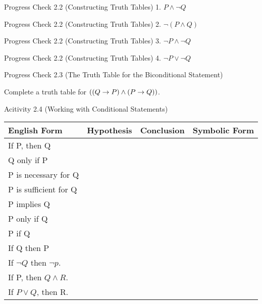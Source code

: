 \documentclass{beamer}
\begin{document}
\begin{frame}{Progress Check 2.2 (Constructing Truth Tables)}
	1. $P \wedge \neg Q$
\end{frame}

\begin{frame}{Progress Check 2.2 (Constructing Truth Tables)}
	2. $\neg(P \wedge Q)$
\end{frame}

\begin{frame}{Progress Check 2.2 (Constructing Truth Tables)}
	3. $\neg P \wedge \neg Q$
\end{frame}

\begin{frame}{Progress Check 2.2 (Constructing Truth Tables)}
	4. $\neg P \vee \neg Q$
\end{frame}

\begin{frame}{Progress Check 2.3 (The Truth Table for the Biconditional Statement)}
	\begin{center}
		Complete a truth table for $\large((Q \to P) \wedge (P \to Q)\large)$.
	\end{center}
	\vspace{3 in}
\end{frame} 

\begin{frame}{Acitivity 2.4 (Working with Conditional Statements)}
	\begin{tabular}{|l|c|c|c|}
		\hline
		English Form & Hypothesis & Conclusion & Symbolic Form\\[.05 in] \hline
		If P, then Q &&&\\[.05 in] \hline
		Q only if P  &&&\\[.05 in] \hline
		P is necessary for Q  &&&\\[.05 in] \hline
		P is sufficient for Q  &&&\\[.05 in] \hline
		P implies Q  &&&\\[.05 in] \hline
		P only if Q  &&&\\[.05 in] \hline
		P if Q  &&&\\[.05 in] \hline
		If Q then P  &&&\\[.05 in] \hline
		If $\neg Q$ then $\neg p$. &&&\\[.05 in] \hline
		If P, then $Q \wedge R$.  &&&\\[.05 in] \hline
		If $P \vee Q$, then R.  &&&\\[.05 in] \hline
	\end{tabular}
\end{frame}
\end{document}
